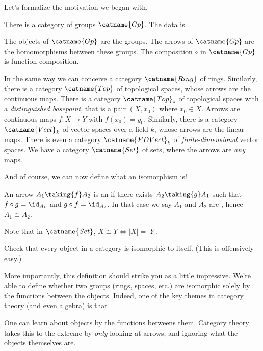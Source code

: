 Let's formalize the motivation we began with.
\begin{example}
	\listhack
	\label{example:basic_categories}
	\begin{enumerate}[(a)]
		\ii There is a category of groups $\catname{Gp}$. The data is
		\begin{itemize}
			\ii The objects of $\catname{Gp}$ are the groups.
			\ii The arrows of $\catname{Gp}$ are the homomorphisms between these groups.
			\ii The composition $\circ$ in $\catname{Gp}$ is function composition.
		\end{itemize}
		\ii In the same way we can conceive a category $\catname{Ring}$ of rings.
		\ii Similarly, there is a category $\catname{Top}$ of topological spaces,
		whose arrows are the continuous maps.
		\ii There is a category $\catname{Top}_\ast$ of topological spaces with a \emph{distinguished basepoint},
		that is a pair $(X, x_0)$ where $x_0 \in X$.
		Arrows are continuous maps $f : X \to Y$ with $f(x_0) = y_0$.
		\ii Similarly, there is a category $\catname{Vect}_k$ of vector spaces over a field $k$,
		whose arrows are the linear maps.
		There is even a category $\catname{FDVect}_k$ of \emph{finite-dimensional} vector spaces.
		\ii We have a category $\catname{Set}$ of sets,
		where the arrows are \emph{any} maps.
	\end{enumerate}
\end{example}
And of course, we can now define what an isomorphism is!
\begin{definition}
	An arrow $A_1 \taking{f} A_2$ is an 
	if there exists $A_2 \taking{g} A_1$ such that $f \circ g = \id_{A_1}$
	and $g \circ f = \id_{A_2}$.
	In that case we say $A_1$ and $A_2$ are , hence $A_1 \cong A_2$.
\end{definition}
\begin{remark}
	Note that in $\catname{Set}$, $X \cong Y
	\iff \left\lvert X \right\rvert = \left\lvert Y \right\rvert$.
\end{remark}
\begin{ques}
	Check that every object in a category is isomorphic to itself.
	(This is offensively easy.)
\end{ques}
More importantly, this definition should strike you as a little impressive.
We're able to define whether two groups (rings, spaces, etc.) are isomorphic
solely by the functions between the objects.
Indeed, one of the key themes in category theory (and even algebra) is that
\begin{moral}
	One can learn about objects by the functions betweens them.
	Category theory takes this to the extreme by \emph{only} looking at arrows,
	and ignoring what the objects themselves are.
\end{moral}

